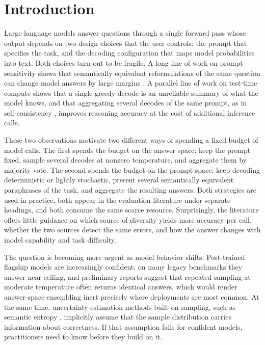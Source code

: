 \section{Introduction}
\label{sec:intro}

Large language models answer questions through a single forward pass whose output depends on two design choices that the user controls: the prompt that specifies the task, and the decoding configuration that maps model probabilities into text. Both choices turn out to be fragile. A long line of work on prompt sensitivity shows that semantically equivalent reformulations of the same question can change model answers by large margins \citep{mizrahi2024state,sclar2024quantifying,leidinger2023language,zhu2023promptbench}. A parallel line of work on test-time compute shows that a single greedy decode is an unreliable summary of what the model knows, and that aggregating several decodes of the same prompt, as in self-consistency \citep{wang2023selfconsistency}, improves reasoning accuracy at the cost of additional inference calls.

These two observations motivate two different ways of spending a fixed budget of model calls. The first spends the budget on the answer space: keep the prompt fixed, sample several decodes at nonzero temperature, and aggregate them by majority vote. The second spends the budget on the prompt space: keep decoding deterministic or lightly stochastic, present several semantically equivalent paraphrases of the task, and aggregate the resulting answers. Both strategies are used in practice, both appear in the evaluation literature under separate headings, and both consume the same scarce resource. Surprisingly, the literature offers little guidance on which source of diversity yields more accuracy per call, whether the two sources detect the same errors, and how the answer changes with model capability and task difficulty.

The question is becoming more urgent as model behavior shifts. Post-trained flagship models are increasingly confident: on many legacy benchmarks they answer near ceiling, and preliminary reports suggest that repeated sampling at moderate temperature often returns identical answers, which would render answer-space ensembling inert precisely where deployments are most common. At the same time, uncertainty estimation methods built on sampling, such as semantic entropy \citep{kuhn2023semantic,farquhar2024detecting}, implicitly assume that the sample distribution carries information about correctness. If that assumption fails for confident models, practitioners need to know before they build on it.

